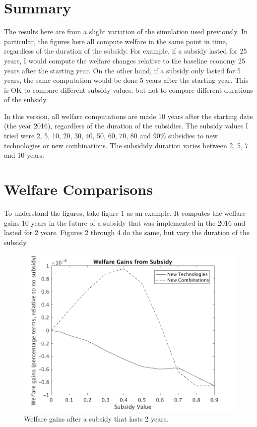 \documentclass[serif]{article}
\theoremstyle{definition}
\begin{document}
\section{Summary}

The results here are from a slight variation of the simulation used previously. In particular, the figures here all compute welfare in the same point in time, regardless of the duration of the subsidy. For example, if a subsidy lasted for 25 years, I would compute the welfare changes relative to the baseline economy 25 years after the starting year. On the other hand, if a subsidy only lasted for 5 years, the same computation would be done 5 years after the starting year. This is OK to compare different subsidy values, but not to compare different durations of the subsidy.

In this version, all welfare computations are made 10 years after the starting date (the year 2016), regardless of the duration of the subsidies. The subsidy values I tried were 2, 5, 10, 20, 30, 40, 50, 60, 70, 80 and 90\% subsidies to new technologies or new combinations. The subsididy duration varies between 2, 5, 7 and 10 years.

\section{Welfare Comparisons}

To understand the figures, take figure 1 as an example. It computes the welfare gains 10 years in the future of a subsidy that was implemented in the 2016 and lasted for 2 years. Figures 2 through 4 do the same, but vary the duration of the subsidy.

\begin{figure}[h!]
\centering
\includegraphics[width=.7\textwidth]{figures/2_years/welfare_gains.png}
\caption{Welfare gains after a subsidy that lasts 2 years.}
\end{figure}
\end{document}
